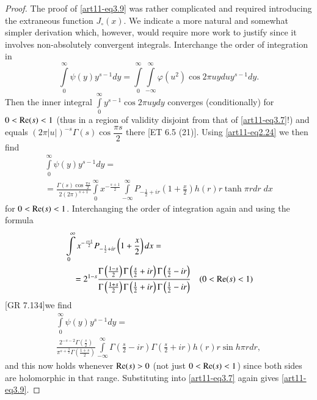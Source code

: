 \begin{proof}
The proof of \eqref{art11-eq3.9} was rather complicated and required introducing the extraneous function $J_\circ (x)$. We indicate a more natural and somewhat simpler derivation which, however, would require more work to justify since it involves non-absolutely convergent integrals. Interchange the order of integration in 
$$
\int\limits^\infty_0 \psi (y) y^{s-1} dy = \int\limits^\infty_0  \int\limits^\infty_{-\infty} \varphi (u^2) \cos 2 \pi u y d u y^{s-1} dy.
$$
Then the inner integral $\int\limits^\infty_0 y^{s-1} \cos 2 \pi u y d y$ converges (conditionally) for $0< \operatorname{Re} (s) <1$ (thus in a region of validity disjoint from that of \eqref{art11-eq3.7}!) and equals $(2 \pi |u|)^{-s} \Gamma (s) \cos \dfrac{\pi s}{2}$ there [ET 6.5 (21)]. Using \eqref{art11-eq2.24} we then find 
\begin{multline*}
\int\limits^\infty_0 \psi (y) y^{s-1} dy = \\
= \frac{\Gamma (s) \cos \frac{\pi s}{2}}{2 (2\pi)^{s+1}} \int\limits^\infty_0 x^{-\frac{s+1}{2}} \int\limits^\infty_{-\infty} P_{-\frac{1}{2} + ir} \left(1+ \frac{x}{2} \right) h(r) r \tanh \pi r dr \;dx
\end{multline*}
for $0 < \operatorname{Re} (s) <1$. Interchanging the order of integration again and using the formula 
\begin{align*}
& \int\limits^\infty_0 x^{-\frac{s+1}{2}} P_{-\frac{1}{2} + ir} \left(1+ \frac{x}{2} \right) dx = \\
&\quad  = 2^{1-s} \frac{\Gamma \left(\frac{1-s}{2} \right) \Gamma \left(\frac{s}{2} +ir \right) \Gamma \left(\frac{s}{2} -ir \right)}{\Gamma \left(\frac{1+s}{2} \right) \Gamma \left(\frac{1}{2} + ir \right) \Gamma \left(\frac{1}{2} - ir \right)} \quad (0 < \operatorname{Re} (s) < 1)
\end{align*}
[GR 7.134]\pageoriginale we find 
\begin{multline*}
\int\limits^\infty_0 \psi (y) y^{s-1} dy = \\
\frac{2^{-s-2} \Gamma \left(\frac{s}{2} \right)}{\pi^{s+ \frac{3}{2}} \Gamma \left(\frac{1+s}{2} \right)} \int\limits^\infty_{-\infty} \Gamma \left(\frac{s}{2} - ir \right) \Gamma \left(\frac{s}{2} + ir \right) h (r) r \sin h \pi r d r, 
\end{multline*}
and this now holds whenever $\operatorname{Re} (s) >0$ (not just $0 <\operatorname{Re} (s) <1$) since both sides are holomorphic in that range. Substituting into \eqref{art11-eq3.7} again gives \eqref{art11-eq3.9}.



\end{proof}
